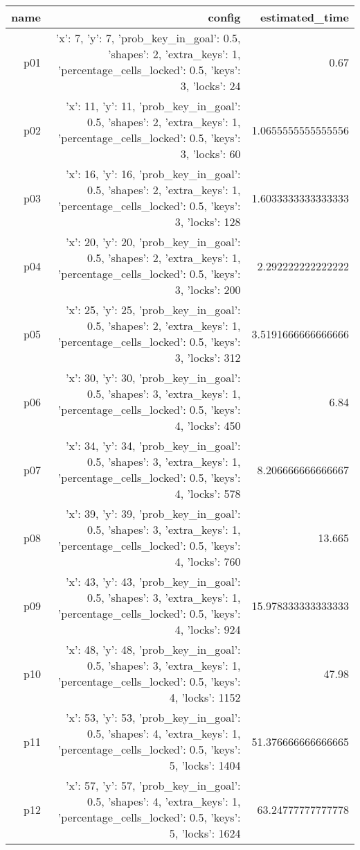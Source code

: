 \documentclass{article}
\begin{document}
                            \begin{center}
                            \scriptsize
                            \begin{tabular}{r|r|r}
                            name & config & estimated\_time\\\midrule
                              p01&{'x': 7, 'y': 7, 'prob\_key\_in\_goal': 0.5, 'shapes': 2, 'extra\_keys': 1, 'percentage\_cells\_locked': 0.5, 'keys': 3, 'locks': 24}&0.67\\
  p02&{'x': 11, 'y': 11, 'prob\_key\_in\_goal': 0.5, 'shapes': 2, 'extra\_keys': 1, 'percentage\_cells\_locked': 0.5, 'keys': 3, 'locks': 60}&1.0655555555555556\\
  p03&{'x': 16, 'y': 16, 'prob\_key\_in\_goal': 0.5, 'shapes': 2, 'extra\_keys': 1, 'percentage\_cells\_locked': 0.5, 'keys': 3, 'locks': 128}&1.6033333333333333\\
  p04&{'x': 20, 'y': 20, 'prob\_key\_in\_goal': 0.5, 'shapes': 2, 'extra\_keys': 1, 'percentage\_cells\_locked': 0.5, 'keys': 3, 'locks': 200}&2.292222222222222\\
  p05&{'x': 25, 'y': 25, 'prob\_key\_in\_goal': 0.5, 'shapes': 2, 'extra\_keys': 1, 'percentage\_cells\_locked': 0.5, 'keys': 3, 'locks': 312}&3.5191666666666666\\
  p06&{'x': 30, 'y': 30, 'prob\_key\_in\_goal': 0.5, 'shapes': 3, 'extra\_keys': 1, 'percentage\_cells\_locked': 0.5, 'keys': 4, 'locks': 450}&6.84\\
  p07&{'x': 34, 'y': 34, 'prob\_key\_in\_goal': 0.5, 'shapes': 3, 'extra\_keys': 1, 'percentage\_cells\_locked': 0.5, 'keys': 4, 'locks': 578}&8.206666666666667\\
  p08&{'x': 39, 'y': 39, 'prob\_key\_in\_goal': 0.5, 'shapes': 3, 'extra\_keys': 1, 'percentage\_cells\_locked': 0.5, 'keys': 4, 'locks': 760}&13.665\\
  p09&{'x': 43, 'y': 43, 'prob\_key\_in\_goal': 0.5, 'shapes': 3, 'extra\_keys': 1, 'percentage\_cells\_locked': 0.5, 'keys': 4, 'locks': 924}&15.978333333333333\\
  p10&{'x': 48, 'y': 48, 'prob\_key\_in\_goal': 0.5, 'shapes': 3, 'extra\_keys': 1, 'percentage\_cells\_locked': 0.5, 'keys': 4, 'locks': 1152}&47.98\\
  p11&{'x': 53, 'y': 53, 'prob\_key\_in\_goal': 0.5, 'shapes': 4, 'extra\_keys': 1, 'percentage\_cells\_locked': 0.5, 'keys': 5, 'locks': 1404}&51.376666666666665\\
  p12&{'x': 57, 'y': 57, 'prob\_key\_in\_goal': 0.5, 'shapes': 4, 'extra\_keys': 1, 'percentage\_cells\_locked': 0.5, 'keys': 5, 'locks': 1624}&63.24777777777778\\

\end{tabular}
\end{center}
\end{document}
